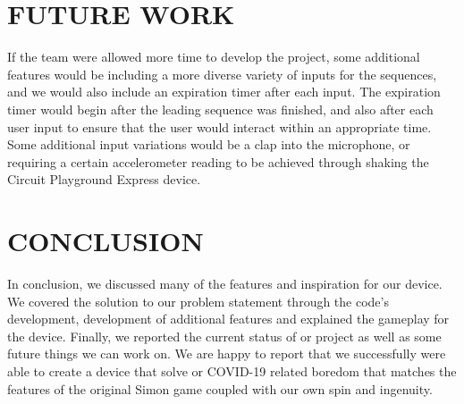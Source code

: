 \documentclass[12pt]{article}
\begin{document}
\section{FUTURE WORK} %

If the team were allowed more time to develop the project, some additional features would be including a more diverse variety of inputs for the sequences, and we would also include an expiration timer after each input. The expiration timer would begin after the leading sequence was finished, and also after each user input to ensure that the user would interact within an appropriate time. Some additional input variations would be a clap into the microphone, or requiring a certain accelerometer reading to be achieved through shaking the Circuit Playground Express device.

\section{CONCLUSION} %
In conclusion, we discussed many of the features and inspiration for our device.  We covered the solution to our problem statement through the code's development, development of additional features and explained the gameplay for the device. Finally, we reported the current status of or project as well as some future things we can work on.  We are happy to report that we successfully were able to create a device that solve or COVID-19 related boredom that matches the features of the original Simon game coupled with our own spin and ingenuity.

\newpage


\newpage
\appendix
\end{document}

